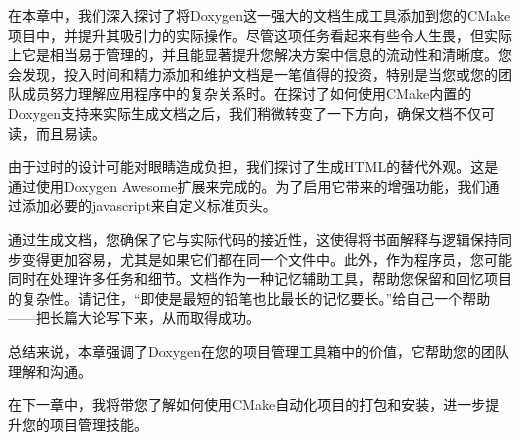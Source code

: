在本章中，我们深入探讨了将Doxygen这一强大的文档生成工具添加到您的CMake项目中，并提升其吸引力的实际操作。尽管这项任务看起来有些令人生畏，但实际上它是相当易于管理的，并且能显著提升您解决方案中信息的流动性和清晰度。您会发现，投入时间和精力添加和维护文档是一笔值得的投资，特别是当您或您的团队成员努力理解应用程序中的复杂关系时。在探讨了如何使用CMake内置的Doxygen支持来实际生成文档之后，我们稍微转变了一下方向，确保文档不仅可读，而且易读。

由于过时的设计可能对眼睛造成负担，我们探讨了生成HTML的替代外观。这是通过使用Doxygen Awesome扩展来完成的。为了启用它带来的增强功能，我们通过添加必要的javascript来自定义标准页头。

通过生成文档，您确保了它与实际代码的接近性，这使得将书面解释与逻辑保持同步变得更加容易，尤其是如果它们都在同一个文件中。此外，作为程序员，您可能同时在处理许多任务和细节。文档作为一种记忆辅助工具，帮助您保留和回忆项目的复杂性。请记住，“即使是最短的铅笔也比最长的记忆要长。”给自己一个帮助——把长篇大论写下来，从而取得成功。

总结来说，本章强调了Doxygen在您的项目管理工具箱中的价值，它帮助您的团队理解和沟通。

在下一章中，我将带您了解如何使用CMake自动化项目的打包和安装，进一步提升您的项目管理技能。